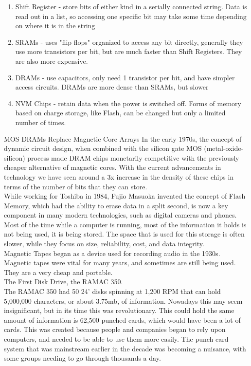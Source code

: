 \documentclass[letterpaper, 10 pt, conference]{IEEEconf}
\begin{document}
\begin{enumerate}
    \item Shift Register - store bits of either kind in a serially connected string. Data is read out in a list, so accessing one specific bit may take some time depending on where it is in the string
    \item SRAMs - uses "flip flops" organized to access any bit directly, generally they use more transistors per bit, but are much faster than Shift Registers. They are also more expensive.
    \item DRAMs - use capacitors, only need 1 transistor per bit, and have simpler access circuits. DRAMs are more dense than SRAMs, but slower
    \item NVM Chips - retain data when the power is switched off. Forms of memory based on charge storage, like Flash, can be changed but only a limited number of times.
\end{enumerate}

MOS DRAMs Replace Magnetic Core Arrays
In the early 1970s, the concept of dynamic circuit design, when combined with the silicon gate MOS (metal-oxide-silicon) process made DRAM chips monetarily competitive with the previously cheaper alternative of magnetic cores. With the current advancements in technology we have seen around a 3x increase in the density of these chips in terms of the number of bits that they can store. \\

While working for Toshiba in 1984, Fujio Masuoka invented the concept of Flash Memory, which had the ability to erase data in a split second, is now a key component in many modern technologies, such as digital cameras and phones. \\

Most of the time while a computer is running, most of the information it holds is not being used, it is being stored. The space that is used for this storage is often slower, while they focus on size, reliability, cost, and data integrity. \\

Magnetic Tapes began as a device used for recording audio in the 1930s. Magnetic tapes were vital for many years, and sometimes are still being used. They are a very cheap and portable.\\

The First Disk Drive, the RAMAC 350. \\ The RAMAC 350 had 50 24' disks spinning at 1,200 RPM that can hold 5,000,000 characters, or about 3.75mb, of information. Nowadays this may seem insignificant, but in its time this was revolutionary. This could hold the same amount of information is 62,500 punched cards, which would have been a lot of cards. This was created because people and companies began to rely upon computers, and needed to be able to use them more easily. The punch card system that was mainstream earlier in the decade was becoming a nuisance, with some groups needing to go through thousands a day.\\
\end{document}
